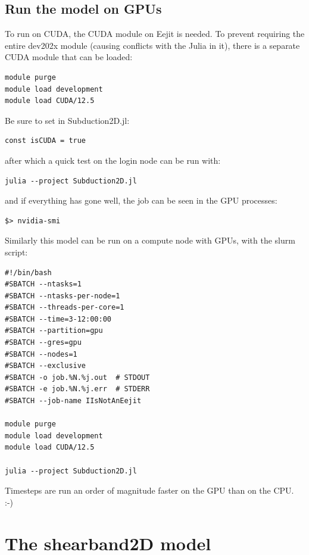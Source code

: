 \documentclass{article}
\begin{document}
\subsection{Run the model on GPUs}

To run on CUDA, the CUDA module on Eejit is needed.
To prevent requiring the entire dev202x module (causing conflicts with the Julia in it), 
there is a separate CUDA module that can be loaded:

\begin{verbatim}
module purge
module load development
module load CUDA/12.5
\end{verbatim}

Be sure to set in Subduction2D.jl:

\begin{verbatim}
const isCUDA = true
\end{verbatim}

after which a quick test on the login node can be run with:

\begin{verbatim}
julia --project Subduction2D.jl
\end{verbatim}

and if everything has gone well, the job can be seen in the GPU processes:

\begin{verbatim}
$> nvidia-smi
\end{verbatim}

Similarly this model can be run on a compute node with GPUs, with the slurm script:

\begin{verbatim}
#!/bin/bash
#SBATCH --ntasks=1
#SBATCH --ntasks-per-node=1
#SBATCH --threads-per-core=1
#SBATCH --time=3-12:00:00
#SBATCH --partition=gpu
#SBATCH --gres=gpu
#SBATCH --nodes=1
#SBATCH --exclusive
#SBATCH -o job.%N.%j.out  # STDOUT
#SBATCH -e job.%N.%j.err  # STDERR
#SBATCH --job-name IIsNotAnEejit

module purge
module load development
module load CUDA/12.5

julia --project Subduction2D.jl
\end{verbatim}

Timesteps are run an order of magnitude faster on the GPU than on the CPU. :-)


\section{The shearband2D model}
\end{document}

